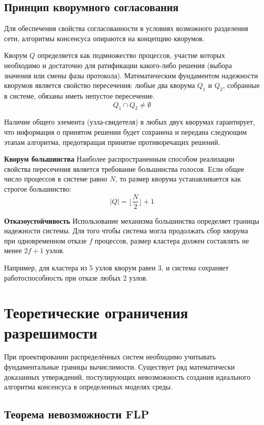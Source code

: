 \subsection{Принцип кворумного согласования}

Для обеспечения свойства согласованности в условиях возможного разделения сети, алгоритмы консенсуса опираются на концепцию кворумов.

Кворум $Q$ определяется как подмножество процессов, участие которых необходимо и достаточно для ратификации какого-либо решения (выбора значения или смены фазы протокола). Математическим фундаментом надежности кворумов является свойство пересечения: любые два кворума $Q_1$ и $Q_2$, собранные в системе, обязаны иметь непустое пересечение.
\[ Q_1 \cap Q_2 \neq \emptyset \]

Наличие общего элемента (узла-свидетеля) в любых двух кворумах гарантирует, что информация о принятом решении будет сохранена и передана следующим этапам алгоритма, предотвращая принятие противоречащих решений.

\textbf{Кворум большинства}
Наиболее распространенным способом реализации свойства пересечения является требование большинства голосов. Если общее число процессов в системе равно $N$, то размер кворума устанавливается как строгое большинство:
\[ |Q| = \lfloor \frac{N}{2} \rfloor + 1 \]

\textbf{Отказоустойчивость}
Использование механизма большинства определяет границы надежности системы. Для того чтобы система могла продолжать сбор кворума при одновременном отказе $f$ процессов, размер кластера должен составлять не менее $2f + 1$ узлов.

Например, для кластера из 5 узлов кворум равен 3, и система сохраняет работоспособность при отказе любых 2 узлов.

\section{Теоретические ограничения разрешимости}

При проектировании распределённых систем необходимо учитывать фундаментальные границы вычислимости. Существует ряд математически доказанных утверждений, постулирующих невозможность создания идеального алгоритма консенсуса в определенных моделях среды.

\subsection{Теорема невозможности FLP}

